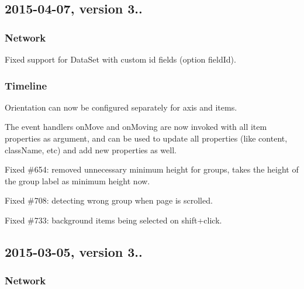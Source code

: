 \subsection*{2015-\/04-\/07, version 3..}

\subsubsection*{Network}


\begin{DoxyItemize}
\item Fixed support for Data\+Set with custom id fields (option {\ttfamily field\+Id}).
\end{DoxyItemize}

\subsubsection*{Timeline}


\begin{DoxyItemize}
\item Orientation can now be configured separately for axis and items.
\item The event handlers {\ttfamily on\+Move} and {\ttfamily on\+Moving} are now invoked with all item properties as argument, and can be used to update all properties (like content, class\+Name, etc) and add new properties as well.
\item Fixed \#654\+: removed unnecessary minimum height for groups, takes the height of the group label as minimum height now.
\item Fixed \#708\+: detecting wrong group when page is scrolled.
\item Fixed \#733\+: background items being selected on shift+click.
\end{DoxyItemize}

\subsection*{2015-\/03-\/05, version 3..}

\subsubsection*{Network}


